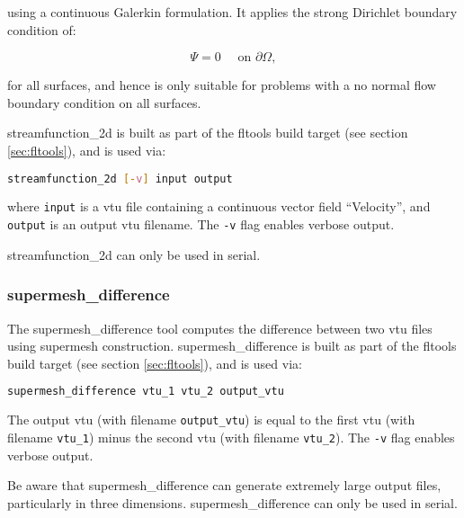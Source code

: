 using a continuous Galerkin formulation. It applies the strong Dirichlet
boundary condition of:

\begin{equation}
\Psi = 0 \quad \text{ on } \partial \Omega,
\end{equation}

for all surfaces, and hence is only suitable for problems with a no normal flow boundary
condition on all surfaces.

streamfunction\_2d is built as part of the fltools build target (see section \ref{sec:fltools}),
and is used via:

\begin{lstlisting}[language = Bash]
streamfunction_2d [-v] input output
\end{lstlisting}

where \lstinline[language = Bash]+input+ is a vtu file containing a continuous vector
field ``Velocity'', and \lstinline[language = Bash]+output+ is an output vtu filename. The
\lstinline[language = Bash]+-v+ flag enables verbose output.

streamfunction\_2d can only be used in serial.


\subsubsection{supermesh\_difference}
\label{sec:supermesh_difference}

The supermesh\_difference tool computes the difference between two vtu
files using supermesh construction. supermesh\_difference is built as part of
the fltools build target (see section \ref{sec:fltools}), and is used via:

\begin{lstlisting}[language = Bash]
supermesh_difference vtu_1 vtu_2 output_vtu
\end{lstlisting}

The output vtu (with filename \lstinline[language = Bash]+output_vtu+)
is equal to the first vtu (with filename \lstinline[language = Bash]+vtu_1+)
minus the second vtu (with filename \lstinline[language = Bash]+vtu_2+).  The
\lstinline[language = Bash]+-v+ flag enables verbose output.

Be aware that supermesh\_difference can generate extremely large output files,
particularly in three dimensions. supermesh\_difference can only be used in
serial.

